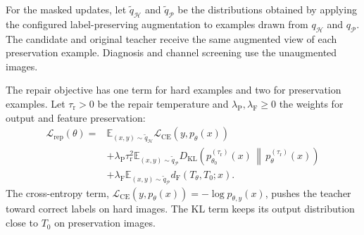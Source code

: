 \documentclass[review,number,sort&compress]{elsarticle}
\theoremstyle{definition}
\begin{document}
For the masked updates, let $\widetilde q_{\mathcal H}$ and
$\widetilde q_{\mathcal P}$ be the distributions obtained
by applying the configured label-preserving augmentation to
examples drawn from $q_{\mathcal H}$ and $q_{\mathcal P}$.
The candidate and original teacher receive the same
augmented view of each preservation example. Diagnosis and
channel screening use the unaugmented images.

The repair objective has one term for hard examples and two
for preservation examples. Let $\tau_{\mathrm r}>0$ be the
repair temperature and $\lambda_{\mathrm P},\lambda_{\mathrm F}
\geq0$ the weights for output and feature preservation:
\begin{equation}
\label{eq:teacher-repair-loss}
\begin{aligned}
\mathcal L_{\mathrm{rep}}(\theta)
={}&\mathbb E_{(x,y)\sim\widetilde q_{\mathcal H}}
  \mathcal L_{\mathrm{CE}}(y,p_\theta(x))\\
&+\lambda_{\mathrm P}\tau_{\mathrm r}^{2}
\mathbb E_{(x,y)\sim\widetilde q_{\mathcal P}}
 D_{\mathrm{KL}}\!\left(
 p_{\theta_0}^{(\tau_{\mathrm r})}(x)
 \,\middle\|\,p_\theta^{(\tau_{\mathrm r})}(x)\right)\\
&+\lambda_{\mathrm F}
\mathbb E_{(x,y)\sim\widetilde q_{\mathcal P}}
 d_{\mathrm F}(T_\theta,T_0;x).
\end{aligned}
\end{equation}
The cross-entropy term,
$\mathcal L_{\mathrm{CE}}(y,p_\theta(x))
=-\log p_{\theta,y}(x)$, pushes the teacher toward correct
labels on hard images. The KL term keeps its output
distribution close to $T_0$ on preservation images.
\end{document}

